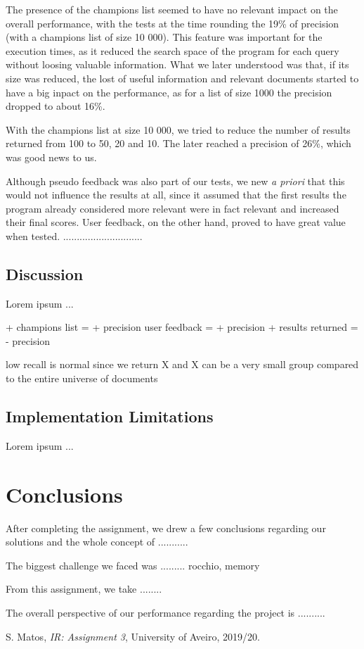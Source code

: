 \documentclass[12pt]{article}
\begin{document}
The presence of the champions list seemed to have no relevant impact on the 
overall performance, with the tests at the time rounding the 19\% of precision
(with a champions list of size 10 000).
This feature was important for the execution times, as it reduced the search 
space of the program for each query without loosing valuable information.
What we later understood was that, if its size was reduced, the lost of useful
information and relevant documents started to have a big inpact on the performance,
as for a list of size 1000 the precision dropped to about 16\%.

With the champions list at size 10 000, we tried to reduce the number of results
returned from 100 to 50, 20 and 10. 
The later reached a precision of 26\%, which was good news to us.

Although pseudo feedback was also part of our tests, we new \textit{a priori} 
that this would not influence the results at all, since it assumed that the first
results the program already considered more relevant were in fact relevant and 
increased their final scores.
User feedback, on the other hand, proved to have great value when tested.
.............................







\subsection{Discussion}\label{discussion}

Lorem ipsum ...

+ champions list = + precision
user feedback = + precision
+ results returned = - precision

low recall is normal since we return X and X can be a very small group compared to the entire universe of documents

\subsection{Implementation Limitations}

Lorem ipsum ...

\section{Conclusions}

After completing the assignment, we drew a few conclusions regarding our
solutions and the whole concept of ...........

The biggest challenge we faced was ......... rocchio, memory

From this assignment, we take ........

The overall perspective of our performance regarding the project is ..........

\begin{thebibliography}{9}
  

    S. Matos,
    \textit{IR: Assignment 3},
    University of Aveiro,
    2019/20.
  
\end{thebibliography}

\clearpage
\end{document}
